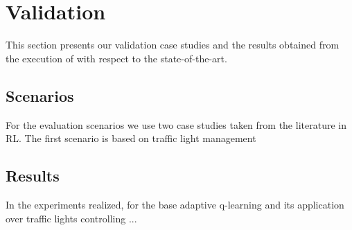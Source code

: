 
\section{Validation}
\label{sec:validation}

This section presents our validation case studies and the results obtained from the execution of \adaptiverl with respect to the state-of-the-art.

\subsection{Scenarios}

For the evaluation scenarios we use two case studies taken from the literature in \ac{RL}. The first scenario is based on traffic light management~\cite{} 

\subsection{Results}

In the experiments realized, for the base adaptive q-learning and its application over traffic lights controlling ...



\endinput

